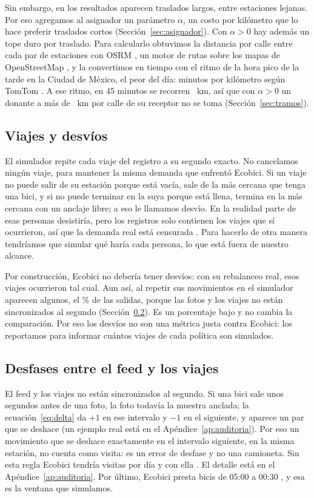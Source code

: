 \documentclass[conference,letterpaper,10pt]{IEEEtran}
\begin{document}
Sin embargo, en los resultados aparecen traslados largos, entre estaciones lejanas. Por eso agregamos al asignador un parámetro $\alpha$, un costo por kilómetro que lo hace preferir traslados cortos (Sección~\ref{sec:asignador}). Con $\alpha>0$ hay además un tope duro por traslado. Para calcularlo obtuvimos la distancia por calle entre cada par de estaciones con OSRM \cite{luxen2011}, un motor de rutas sobre los mapas de OpenStreetMap \cite{osm}, y la convertimos en tiempo con el ritmo de la hora pico de la tarde en la Ciudad de México, el peor del día: \tfMpkPm{} minutos por kilómetro según TomTom \cite{tomtom2025}. A ese ritmo, en 45 minutos se recorren \tfLimKm~km, así que con $\alpha>0$ un donante a más de \tfLimKm~km por calle de su receptor no se toma (Sección~\ref{sec:tramos}).

\subsection{Viajes y desvíos}\label{sec:viajes}
El simulador repite cada viaje del registro a su segundo exacto. No cancelamos ningún viaje, para mantener la misma demanda que enfrentó Ecobici. Si un viaje no puede salir de su estación porque está vacía, sale de la más cercana que tenga una bici, y si no puede terminar en la suya porque está llena, termina en la más cercana con un anclaje libre; a eso le llamamos desvío. En la realidad parte de esas personas desistiría, pero los registros solo contienen los viajes que sí ocurrieron, así que la demanda real está censurada \cite{negahban2019}. Para hacerlo de otra manera tendríamos que simular qué haría cada persona, lo que está fuera de nuestro alcance.

Por construcción, Ecobici no debería tener desvíos: con su rebalanceo real, esos viajes ocurrieron tal cual. Aun así, al repetir sus movimientos en el simulador aparecen algunos, el \recoDesvPct\% de las salidas, porque las fotos y los viajes no están sincronizados al segundo (Sección~\ref{sec:desfases}). Es un porcentaje bajo y no cambia la comparación. Por eso los desvíos no son una métrica justa contra Ecobici: los reportamos para informar cuántos viajes de cada política son simulados.

\subsection{Desfases entre el feed y los viajes}\label{sec:desfases}
El feed y los viajes no están sincronizados al segundo. Si una bici sale unos segundos antes de una foto, la foto todavía la muestra anclada; la ecuación~\eqref{eq:delta} da $+1$ en ese intervalo y $-1$ en el siguiente, y aparece un par que se deshace (un ejemplo real está en el Apéndice~\ref{ap:auditoria}). Por eso un movimiento que se deshace exactamente en el intervalo siguiente, en la misma estación, no cuenta como visita: es un error de desfase y no una camioneta. Sin esta regla Ecobici tendría \rvisSinRegla{} visitas por día y con ella \rvisConRegla. El detalle está en el Apéndice~\ref{ap:auditoria}. Por último, Ecobici presta bicis de 05:00 a 00:30 \cite{ecobici_horario}, y esa es la ventana que simulamos.
\end{document}
